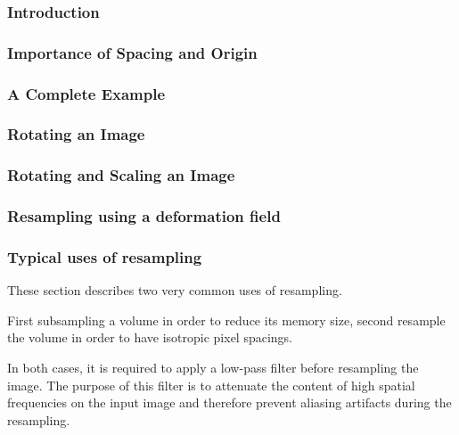 \subsubsection{Introduction}

\ifitkFullVersion

\fi

\subsubsection{Importance of Spacing and Origin}
\ifitkFullVersion

\fi

\subsubsection{A Complete Example}
\ifitkFullVersion

\fi

\subsubsection{Rotating an Image}
\ifitkFullVersion

\fi

\subsubsection{Rotating and Scaling an Image}
\ifitkFullVersion

\fi

\subsubsection{Resampling using a deformation field}
\ifitkFullVersion

\fi


\subsubsection{Typical uses of resampling}

These section describes two very common uses of resampling.

First subsampling a volume in order to reduce its memory size, second resample
the volume in order to have isotropic pixel spacings.

In both cases, it is required to apply a low-pass filter before resampling the
image. The purpose of this filter is to attenuate the content of high spatial
frequencies on the input image and therefore prevent aliasing artifacts during
the resampling. 

